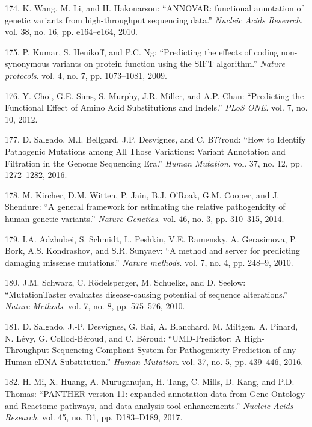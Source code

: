 \documentclass[12pt,a4paper,twoside]{ugathesis}
\theoremstyle{definition}
\theoremstyle{definition}
\theoremstyle{definition}
\theoremstyle{remark}
\begin{document}
\hypertarget{ref-Wang2010}{}
174. K. Wang, M. Li, and H. Hakonarson: ``ANNOVAR: functional annotation
of genetic variants from high-throughput sequencing data.''
\emph{Nucleic Acids Research}. vol. 38, no. 16, pp. e164--e164, 2010.

\hypertarget{ref-Kumar2009}{}
175. P. Kumar, S. Henikoff, and P.C. Ng: ``Predicting the effects of
coding non-synonymous variants on protein function using the SIFT
algorithm.'' \emph{Nature protocols}. vol. 4, no. 7, pp. 1073--1081,
2009.

\hypertarget{ref-Choi2012}{}
176. Y. Choi, G.E. Sims, S. Murphy, J.R. Miller, and A.P. Chan:
``Predicting the Functional Effect of Amino Acid Substitutions and
Indels.'' \emph{PLoS ONE}. vol. 7, no. 10, 2012.

\hypertarget{ref-Salgado2016}{}
177. D. Salgado, M.I. Bellgard, J.P. Desvignes, and C. B??roud: ``How to
Identify Pathogenic Mutations among All Those Variations: Variant
Annotation and Filtration in the Genome Sequencing Era.'' \emph{Human
Mutation}. vol. 37, no. 12, pp. 1272--1282, 2016.

\hypertarget{ref-Kircher2014}{}
178. M. Kircher, D.M. Witten, P. Jain, B.J. O'Roak, G.M. Cooper, and J.
Shendure: ``A general framework for estimating the relative
pathogenicity of human genetic variants.'' \emph{Nature Genetics}. vol.
46, no. 3, pp. 310--315, 2014.

\hypertarget{ref-Adzhubei2010}{}
179. I.A. Adzhubei, S. Schmidt, L. Peshkin, V.E. Ramensky, A.
Gerasimova, P. Bork, A.S. Kondrashov, and S.R. Sunyaev: ``A method and
server for predicting damaging missense mutations.'' \emph{Nature
methods}. vol. 7, no. 4, pp. 248--9, 2010.

\hypertarget{ref-Schwarz2010}{}
180. J.M. Schwarz, C. Rödelsperger, M. Schuelke, and D. Seelow:
``MutationTaster evaluates disease-causing potential of sequence
alterations.'' \emph{Nature Methods}. vol. 7, no. 8, pp. 575--576, 2010.

\hypertarget{ref-Salgado2016a}{}
181. D. Salgado, J.-P. Desvignes, G. Rai, A. Blanchard, M. Miltgen, A.
Pinard, N. Lévy, G. Collod-Béroud, and C. Béroud: ``UMD-Predictor: A
High-Throughput Sequencing Compliant System for Pathogenicity Prediction
of any Human cDNA Substitution.'' \emph{Human Mutation}. vol. 37, no. 5,
pp. 439--446, 2016.

\hypertarget{ref-Mi2017}{}
182. H. Mi, X. Huang, A. Muruganujan, H. Tang, C. Mills, D. Kang, and
P.D. Thomas: ``PANTHER version 11: expanded annotation data from Gene
Ontology and Reactome pathways, and data analysis tool enhancements.''
\emph{Nucleic Acids Research}. vol. 45, no. D1, pp. D183--D189, 2017.
\end{document}
